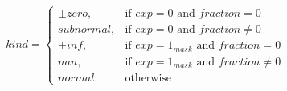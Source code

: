 \begin{equation*}
kind =
\begin{cases}
    \pm zero,  & \text{if $exp = 0$        and $fraction = 0$} \\
    subnormal, & \text{if $exp = 0$        and $fraction \neq 0$} \\
    \pm inf,   & \text{if $exp = 1_{mask}$ and $fraction = 0$} \\
    nan,       & \text{if $exp = 1_{mask}$ and $fraction \neq 0$} \\
    normal.    & \text{otherwise}
\end{cases}
\label{eq:float32_algorithm}
\end{equation*}
